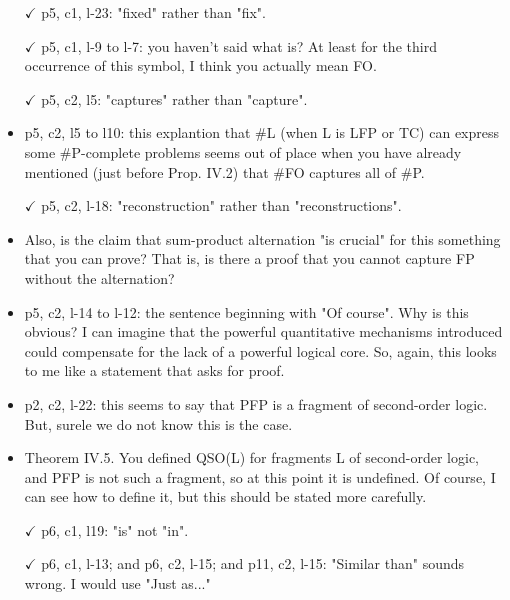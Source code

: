\begin{itemize}
\item[$\checkmark$] p5, c1, l-23: "fixed" rather than "fix".

\item[$\checkmark$] p5, c1, l-9 to l-7: you haven't said what  is? At least for
the third occurrence of this symbol, I think you actually mean FO.

\item[$\checkmark$] p5, c2, l5: "captures" rather than "capture".

\item p5, c2, l5 to l10: this explantion that \#L (when L is LFP or TC)
can express some \#P-complete problems seems out of place when you
have already mentioned (just before Prop. IV.2) that \#FO captures
all of \#P.

\item[$\checkmark$] p5, c2, l-18: "reconstruction" rather than "reconstructions".

\item Also, is the claim that sum-product alternation "is crucial" for
this something that you can prove? That is, is there a proof that
you cannot capture FP without the alternation?

\item p5, c2, l-14 to l-12: the sentence beginning with "Of course". Why
is this obvious? I can imagine that the powerful quantitative
mechanisms introduced could compensate for the lack of a powerful
logical core. So, again, this looks to me like a statement that
asks for proof.

\item p2, c2, l-22: this seems to say that PFP is a fragment of
second-order logic. But, surele we do not know this is the case.

\item Theorem IV.5. You defined QSO(L) for fragments L of second-order
logic, and PFP is not such a fragment, so at this point it is
undefined. Of course, I can see how to define it, but this should
be stated more carefully.

\item[$\checkmark$] p6, c1, l19: "is" not "in".

\item[$\checkmark$] p6, c1, l-13; and p6, c2, l-15; and p11, c2, l-15: "Similar than" sounds wrong. I would use "Just
as..."


\end{itemize}
